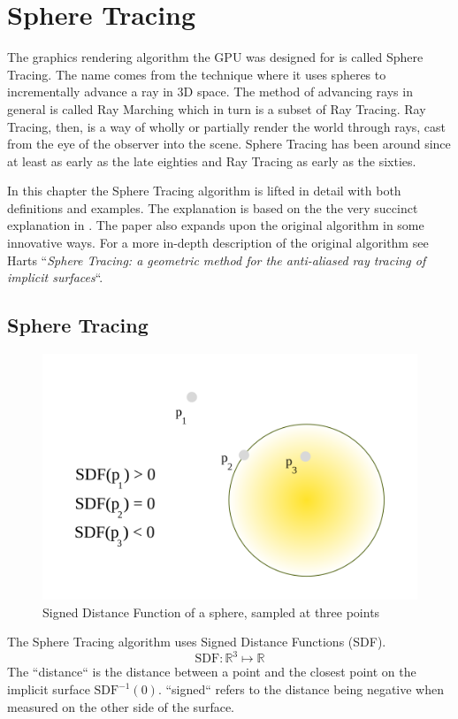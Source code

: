 \chapter{Sphere Tracing} \label{spheretracing}

	The graphics rendering algorithm the GPU was designed for is called
	Sphere Tracing\cite{Hart1996}. The name comes from the technique where it
	uses spheres to incrementally advance a ray in 3D space. The method of
	advancing rays in general is called Ray Marching which in turn is a subset
	of Ray Tracing\cite{Whitted1980a}. Ray Tracing, then, is a way of wholly or
	partially render the world through rays, cast from the eye of the observer
	into the scene. Sphere Tracing has been around since at least as early as
	the late eighties\cite{Hart1989} and Ray Tracing as early as the
	sixties\cite{Appel1968}.

	In this chapter the Sphere Tracing algorithm is lifted in detail with
	both definitions and examples. The explanation is based on the the very
	succinct explanation in \cite{Korndorfer2014}. The paper also expands upon
	the original algorithm in some innovative ways. For a more in-depth
	description of the original algorithm see Harts ``\emph{Sphere Tracing: a
	geometric method for the anti-aliased ray tracing of implicit
	surfaces}``\cite{Hart1996}.

	\section{Sphere Tracing} 

		\begin{figure}
			\includegraphics[width=0.75\linewidth]{figure/SDF} 
			\caption{Signed Distance Function of a sphere, sampled at three 
				points}
		\end{figure}

		The Sphere Tracing algorithm uses Signed Distance Functions (SDF).
		$$\text{SDF}:\mathbb{R}^{3}\mapsto\mathbb{R}$$ The ``distance`` is the
		distance between a point and the closest point on the implicit surface
		$\text{SDF}^{-1}(0)$. ``signed`` refers to the distance being negative
		when measured on the other side of the surface. 

